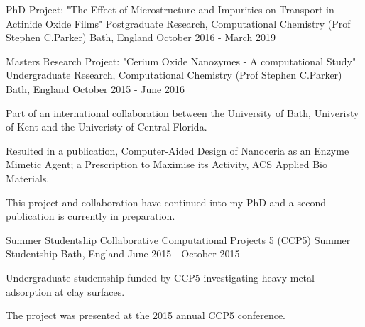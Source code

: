 \begin{cventries}
  \cventry
    {PhD Project: "The Effect of Microstructure and Impurities on Transport in Actinide Oxide Films"}
    {Postgraduate Research, Computational Chemistry (Prof Stephen C.Parker)}
    {Bath, England}
    {October 2016 - March 2019}
    {
      \begin{cvitems}
        \item{ }
      \end{cvitems}
    }

  \cventry
    {Masters Research Project: "Cerium Oxide Nanozymes - A computational Study"}
    {Undergraduate Research, Computational Chemistry (Prof Stephen C.Parker)}
    {Bath, England}
    {October 2015 - June 2016}
    {
      \begin{cvitems}
        \item{Part of an international collaboration between the University of Bath, Univeristy of Kent and the Univeristy of Central Florida.} 
        \item {Resulted in a publication, Computer-Aided Design of Nanoceria as an Enzyme Mimetic Agent; a Prescription to Maximise its Activity, ACS Applied Bio Materials. }
        \item {This project and collaboration have continued into my PhD and a second publication is currently in preparation.}
      \end{cvitems} 
    }
    
  \cventry
    {Summer Studentship}
    {Collaborative Computational Projects 5 (CCP5) Summer Studentship}
    {Bath, England}
    {June 2015 - October 2015}
    {
      \begin{cvitems}
        \item {Undergraduate studentship funded by CCP5 investigating heavy metal adsorption at clay surfaces.}
        \item {The project was presented at the 2015 annual CCP5 conference.}
      \end{cvitems}
    }
\end{cventries}


